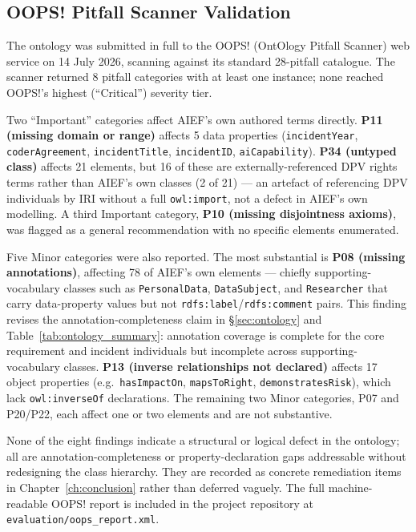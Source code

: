 \subsection{OOPS! Pitfall Scanner Validation}
\label{sec:oops-validation}

The ontology was submitted in full to the OOPS! (OntOlogy Pitfall Scanner) web service \cite{poveda2014oops} on 14 July 2026, scanning against its standard 28-pitfall catalogue. The scanner returned 8 pitfall categories with at least one instance; none reached OOPS!'s highest (``Critical'') severity tier.

Two ``Important'' categories affect AIEF's own authored terms directly. \textbf{P11 (missing domain or range)} affects 5 data properties (\texttt{incidentYear}, \texttt{coderAgreement}, \texttt{incidentTitle}, \texttt{incidentID}, \texttt{aiCapability}). \textbf{P34 (untyped class)} affects 21 elements, but 16 of these are externally-referenced DPV rights terms rather than AIEF's own classes (2 of 21) — an artefact of referencing DPV individuals by IRI without a full \texttt{owl:import}, not a defect in AIEF's own modelling. A third Important category, \textbf{P10 (missing disjointness axioms)}, was flagged as a general recommendation with no specific elements enumerated.

Five Minor categories were also reported. The most substantial is \textbf{P08 (missing annotations)}, affecting 78 of AIEF's own elements — chiefly supporting-vocabulary classes such as \texttt{PersonalData}, \texttt{DataSubject}, and \texttt{Researcher} that carry data-property values but not \texttt{rdfs:label}/\texttt{rdfs:comment} pairs. This finding revises the annotation-completeness claim in \S\ref{sec:ontology} and Table~\ref{tab:ontology_summary}: annotation coverage is complete for the core requirement and incident individuals but incomplete across supporting-vocabulary classes. \textbf{P13 (inverse relationships not declared)} affects 17 object properties (e.g.\ \texttt{hasImpactOn}, \texttt{mapsToRight}, \texttt{demonstratesRisk}), which lack \texttt{owl:inverseOf} declarations. The remaining two Minor categories, P07 and P20/P22, each affect one or two elements and are not substantive.

None of the eight findings indicate a structural or logical defect in the ontology; all are annotation-completeness or property-declaration gaps addressable without redesigning the class hierarchy. They are recorded as concrete remediation items in Chapter~\ref{ch:conclusion} rather than deferred vaguely. The full machine-readable OOPS! report is included in the project repository at \texttt{evaluation/oops\_report.xml}.

